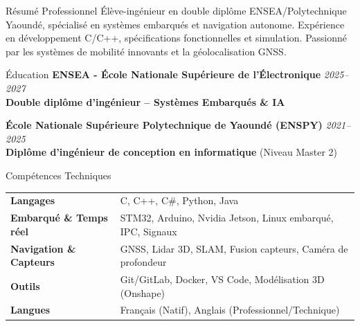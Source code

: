 \documentclass[10pt]{resume}
\begin{document}
\begin{rSection}{Résumé Professionnel}
Élève-ingénieur en double diplôme ENSEA/Polytechnique Yaoundé, spécialisé en systèmes embarqués et navigation autonome. Expérience en développement C/C++, spécifications fonctionnelles et simulation. Passionné par les systèmes de mobilité innovants et la géolocalisation GNSS.
\end{rSection}

\begin{rSection}{Éducation}
{\bf ENSEA - École Nationale Supérieure de l'Électronique} \hfill {\em 2025--2027}\\
\textbf{Double diplôme d'ingénieur -- Systèmes Embarqués \& IA}

{\bf École Nationale Supérieure Polytechnique de Yaoundé (ENSPY)} \hfill {\em 2021--2025}\\
\textbf{Diplôme d'ingénieur de conception en informatique} (Niveau Master 2)
\end{rSection}

\begin{rSection}{Compétences Techniques}
\begin{tabular}{ @{} >{\bfseries}l @{\hspace{6ex}} l }
Langages & C, C++, C\#, Python, Java \\
Embarqué \& Temps réel & STM32, Arduino, Nvidia Jetson, Linux embarqué, IPC, Signaux \\
Navigation \& Capteurs & GNSS, Lidar 3D, SLAM, Fusion capteurs, Caméra de profondeur \\
Outils & Git/GitLab, Docker, VS Code, Modélisation 3D (Onshape) \\
Langues & Français (Natif), Anglais (Professionnel/Technique)
\end{tabular}
\end{rSection}
\end{document}
